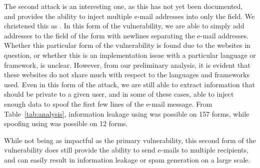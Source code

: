     The second attack is an interesting one, as this has not yet been documented, and provides the ability to inject multiple e-mail addresses into only the  field. We christened this as . In this form of the vulnerability, we are able to simply add addresses to the  field of the form with newlines separating the e-mail addresses. Whether this particular form of the vulnerability is found due to the websites in question, or whether this is an implementation issue with a particular language or framework, is unclear. However, from our preliminary analysis, it is evident that these websites do not share much with respect to the languages and frameworks used. 
    Even in this form of the attack, we are still able to extract information that should be private to a given user, and in some of these cases, able to inject enough data to spoof the first few lines of the e-mail message. From Table~\ref{tab:analysis}, information leakage using  was possible on 157 forms, while spoofing using  was possible on 12 forms.
    
    While not being as impactful as the primary vulnerability, this second form of the vulnerability does still provide the ability to send e-mails to multiple recipients, and can easily result in information leakage or spam generation on a large scale.
    
